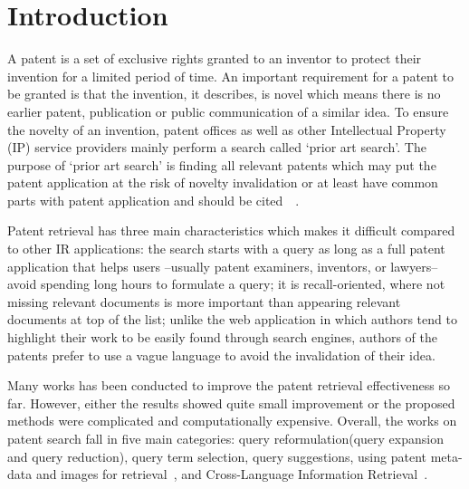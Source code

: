 \documentclass{sig-alternate}
\begin{document}
\section{Introduction}
A patent is a set of exclusive rights granted to an inventor to protect their invention for a limited period of time. An important requirement for a patent to be granted is that the invention, it describes, is novel which means there is no earlier patent, publication or public communication of a similar idea. To ensure the novelty of an invention, patent offices as well as other Intellectual Property (IP) service providers mainly perform a search called `prior art search'. The purpose of `prior art search' is finding all relevant patents which may put the patent application at the risk of novelty invalidation or at least have common parts with patent application and should be cited~\cite{magdy2012toward}~\cite{piroi2013overview}. 

Patent retrieval has three main characteristics which makes it difficult compared to other IR applications: the search starts with a query as long as a full patent application that helps users --usually patent examiners, inventors, or lawyers-- avoid spending long hours to formulate a query; it is recall-oriented, where not missing relevant documents is more important than appearing relevant documents at top of the list; unlike the web application in which authors tend to highlight their work to be easily found through search engines, authors of the patents prefer to use a vague language to avoid the invalidation of their idea.     

Many works has been conducted to improve the patent retrieval effectiveness so far. However, either the results showed quite small improvement or the proposed methods were complicated and computationally expensive. Overall, the works on patent search fall in five main categories: query reformulation(query expansion and query reduction), query term selection, query suggestions, using patent meta-data and images for retrieval~\cite{lupu2013evaluating}, and Cross-Language Information Retrieval~\cite{magdy2014studying}.
\end{document}
